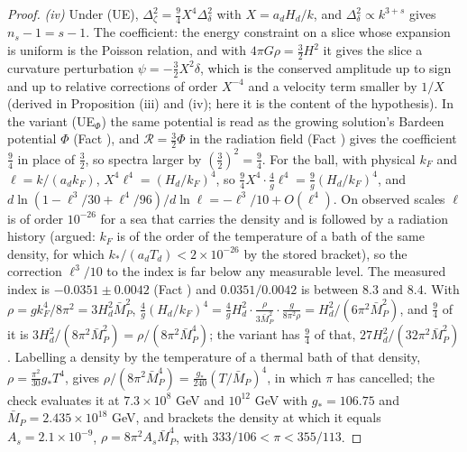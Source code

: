 \begin{proof}
\emph{(iv)} Under (UE), $\Delta^{2}_{\zeta} = \tfrac94X^{4}\Delta^{2}_{\delta}$ with $X = a_{d}H_{d}/k$, and $\Delta^{2}_{\delta} \propto k^{3 + s}$ gives $n_{s} - 1 = s - 1$. The coefficient: the energy constraint on a slice whose expansion is uniform is the Poisson relation, and with $4\pi G\rho = \tfrac32H^{2}$ it gives the slice a curvature perturbation $\psi = -\tfrac32X^{2}\delta$, which is the conserved amplitude up to sign and up to relative corrections of order $X^{-4}$ and a velocity term smaller by $1/X$ (derived in Proposition (iii) and (iv); here it is the content of the hypothesis). In the variant (UE$_{\Phi}$) the same potential is read as the growing solution's Bardeen potential $\Phi$ (Fact ), and $\mathcal{R} = \tfrac32\Phi$ in the radiation field (Fact ) gives the coefficient $\tfrac94$ in place of $\tfrac32$, so spectra larger by $(\tfrac32)^{2} = \tfrac94$. For the ball, with physical $k_{F}$ and $\ell = k/(a_{d}k_{F})$, $X^{4}\ell^{4} = (H_{d}/k_{F})^{4}$, so $\tfrac94X^{4}\cdot\tfrac4g\ell^{4} = \tfrac9g(H_{d}/k_{F})^{4}$, and $d\ln(1 - \ell^{3}/30 + \ell^{4}/96)/d\ln\ell = -\ell^{3}/10 + O(\ell^{4})$. On observed scales $\ell$ is of order $10^{-26}$ for a sea that carries the density and is followed by a radiation history (argued: $k_{F}$ is of the order of the temperature of a bath of the same density, for which $k_{*}/(a_{d}T_{d}) < 2 \times 10^{-26}$ by the stored bracket), so the correction $\ell^{3}/10$ to the index is far below any measurable level. The measured index is $-0.0351 \pm 0.0042$ (Fact ) and $0.0351/0.0042$ is between $8.3$ and $8.4$. With $\rho = gk_{F}^{4}/8\pi^{2} = 3H_{d}^{2}\bar M_{P}^{2}$, $\tfrac4g(H_{d}/k_{F})^{4} = \tfrac4g H_{d}^{2}\cdot\tfrac{\rho}{3\bar M_{P}^{2}}\cdot\tfrac{g}{8\pi^{2}\rho} = H_{d}^{2}/(6\pi^{2}\bar M_{P}^{2})$, and $\tfrac94$ of it is $3H_{d}^{2}/(8\pi^{2}\bar M_{P}^{2}) = \rho/(8\pi^{2}\bar M_{P}^{4})$; the variant has $\tfrac94$ of that, $27H_{d}^{2}/(32\pi^{2}\bar M_{P}^{2})$. Labelling a density by the temperature of a thermal bath of that density, $\rho = \tfrac{\pi^{2}}{30}g_{*}T^{4}$, gives $\rho/(8\pi^{2}\bar M_{P}^{4}) = \tfrac{g_{*}}{240}(T/\bar M_{P})^{4}$, in which $\pi$ has cancelled; the check evaluates it at $7.3 \times 10^{8}$ GeV and $10^{12}$ GeV with $g_{*} = 106.75$ and $\bar M_{P} = 2.435 \times 10^{18}$ GeV, and brackets the density at which it equals $A_{s} = 2.1 \times 10^{-9}$, $\rho = 8\pi^{2}A_{s}\bar M_{P}^{4}$, with $333/106 < \pi < 355/113$.


\end{proof}
